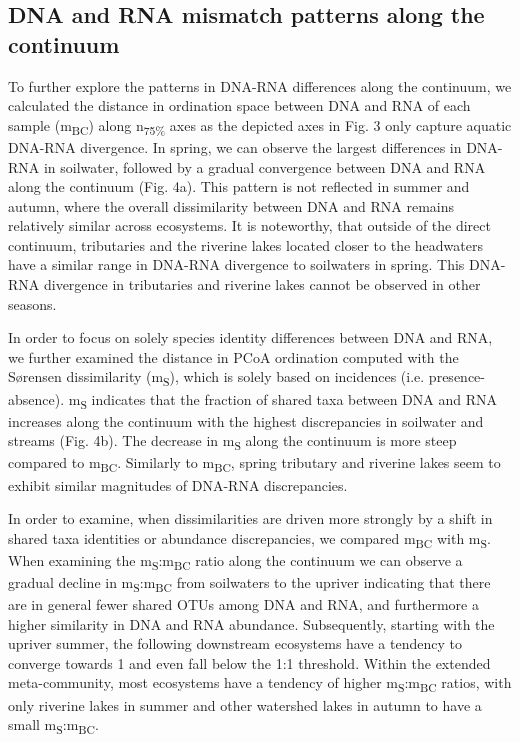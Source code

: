 \documentclass[12pt,a4paper]{article} %
\begin{document}
\subsection*{DNA and RNA mismatch patterns along the continuum}
To further explore the patterns in DNA-RNA differences along the continuum, we calculated the distance in ordination space between DNA and RNA of each sample (m\textsubscript{BC}) along n\textsubscript{75\%} axes as the depicted axes in Fig. 3 only capture aquatic DNA-RNA divergence. In spring, we can observe the largest differences in DNA-RNA in soilwater, followed by a gradual convergence between DNA and RNA along the continuum (Fig. 4a). This pattern is not reflected in summer and autumn, where the overall dissimilarity between DNA and RNA remains relatively similar across ecosystems. It is noteworthy, that outside of the direct continuum, tributaries and the riverine lakes located closer to the headwaters have a similar range in DNA-RNA divergence to soilwaters in spring. This DNA-RNA divergence in tributaries and riverine lakes cannot be observed in other seasons.

In order to focus on solely species identity differences between DNA and RNA, we further examined the distance in PCoA ordination computed with the S{\o}rensen dissimilarity (m\textsubscript{S}), which is solely based on incidences (i.e. presence-absence). m\textsubscript{S} indicates that the fraction of shared taxa between DNA and RNA increases along the continuum with the highest discrepancies in soilwater and streams (Fig. 4b). The decrease in m\textsubscript{S} along the continuum is more steep compared to m\textsubscript{BC}. Similarly to m\textsubscript{BC}, spring tributary and riverine lakes seem to exhibit similar magnitudes of DNA-RNA discrepancies.

In order to examine, when dissimilarities are driven more strongly by a shift in shared taxa identities or abundance discrepancies, we compared m\textsubscript{BC} with m\textsubscript{S}. When examining the m\textsubscript{S}:m\textsubscript{BC} ratio along the continuum we can observe a gradual decline in m\textsubscript{S}:m\textsubscript{BC} from soilwaters to the upriver indicating that there are in general fewer shared OTUs among DNA and RNA, and furthermore a higher similarity in DNA and RNA abundance. Subsequently, starting with the upriver summer, the following downstream ecosystems have a tendency to converge towards 1 and even fall below the 1:1 threshold. Within the extended meta-community, most ecosystems have a tendency of higher m\textsubscript{S}:m\textsubscript{BC} ratios, with only riverine lakes in summer and other watershed lakes in autumn to have a small m\textsubscript{S}:m\textsubscript{BC}.
\end{document}
